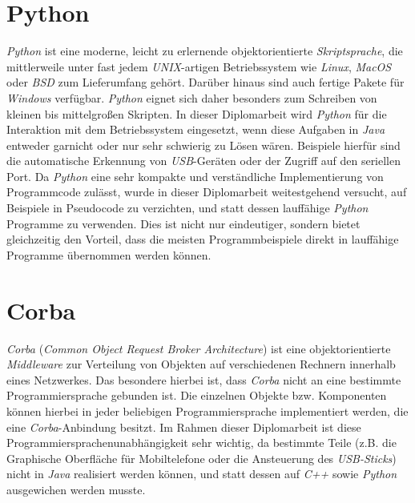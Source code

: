 \section{Python}
    \emph{Python} ist eine moderne, leicht zu erlernende objektorientierte \emph{Skriptsprache}, die mittlerweile 
    unter fast jedem \emph{UNIX}-artigen Betriebssystem wie \emph{Linux}, \emph{MacOS} oder \emph{BSD} zum Lieferumfang 
    gehört. Darüber hinaus sind auch fertige Pakete für \emph{Windows} verfügbar. \emph{Python} eignet sich daher 
    besonders zum Schreiben von kleinen
    bis mittelgroßen Skripten. In dieser Diplomarbeit wird \emph{Python} für die Interaktion mit dem Betriebssystem
    eingesetzt, wenn diese Aufgaben in \emph{Java} entweder garnicht oder nur sehr schwierig zu Lösen wären. Beispiele
    hierfür sind die automatische Erkennung von \emph{USB}-Geräten oder der Zugriff auf den seriellen Port.
    Da \emph{Python} eine sehr kompakte und verständliche Implementierung von Programmcode zulässt, wurde in dieser
    Diplomarbeit weitestgehend versucht, auf Beispiele in Pseudocode zu verzichten, und statt dessen lauffähige
    \emph{Python} Programme zu verwenden. Dies ist nicht nur eindeutiger, sondern bietet gleichzeitig den Vorteil,
    dass die meisten Programmbeispiele direkt in lauffähige Programme übernommen werden können.

\section{Corba}
    \emph{Corba} (\emph{Common Object Request Broker Architecture}) ist eine objektorientierte \emph{Middleware} 
    zur Verteilung von Objekten auf verschiedenen Rechnern innerhalb eines Netzwerkes. Das besondere hierbei ist, 
    dass \emph{Corba} nicht an eine bestimmte Programmiersprache gebunden ist. Die einzelnen Objekte bzw. Komponenten 
    können hierbei in jeder beliebigen Programmiersprache implementiert werden, die eine \emph{Corba}-Anbindung besitzt.
    Im Rahmen dieser Diplomarbeit ist diese Programmiersprachenunabhängigkeit sehr wichtig, da bestimmte
    Teile (z.B. die Graphische Oberfläche für Mobiltelefone oder die Ansteuerung des \emph{USB-Sticks}) nicht in 
    \emph{Java} realisiert werden können, und statt dessen auf \emph{C++} sowie \emph{Python} ausgewichen werden musste.
